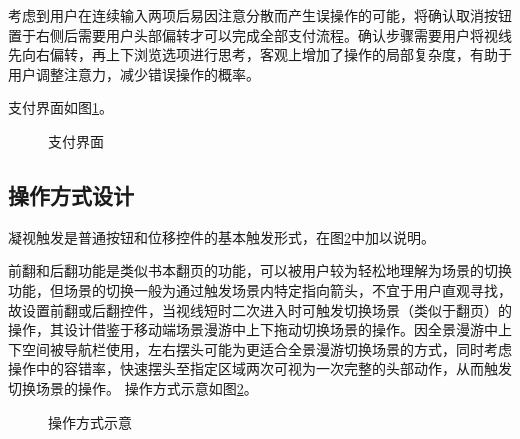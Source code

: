 考虑到用户在连续输入两项后易因注意分散而产生误操作的可能，将确认取消按钮置于右侧后需要用户头部偏转才可以完成全部支付流程。确认步骤需要用户将视线先向右偏转，再上下浏览选项进行思考，客观上增加了操作的局部复杂度，有助于用户调整注意力，减少错误操作的概率。

支付界面如图\ref{fig:d-12}。

\begin{figure}[htp]
\centering
{}
\caption{支付界面}
\label{fig:d-12}
\end{figure}

\subsection{操作方式设计}

凝视触发是普通按钮和位移控件的基本触发形式，在图\ref{fig:d-09}中加以说明。

前翻和后翻功能是类似书本翻页的功能，可以被用户较为轻松地理解为场景的切换功能，但场景的切换一般为通过触发场景内特定指向箭头，不宜于用户直观寻找，故设置前翻或后翻控件，当视线短时二次进入时可触发切换场景（类似于翻页）的操作，其设计借鉴于移动端场景漫游中上下拖动切换场景的操作。因全景漫游中上下空间被导航栏使用，左右摆头可能为更适合全景漫游切换场景的方式，同时考虑操作中的容错率，快速摆头至指定区域两次可视为一次完整的头部动作，从而触发切换场景的操作。
操作方式示意如图\ref{fig:d-09}。

\begin{figure}[htp]
\centering
{}
\caption{操作方式示意}
\label{fig:d-09}
\end{figure}